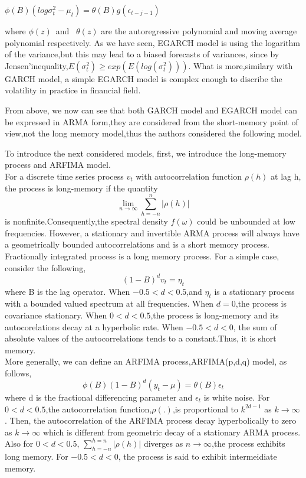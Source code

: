 \documentclass[10pt,a4paper]{article}
\begin{document}
\begin{center}$\displaystyle \phi(B)(log\sigma^2_t-\mu_t)=\theta(B)g(\epsilon_{t-j-1})$\end{center}

where $\phi(z)$\ and \ $\theta(z)$ are the autoregressive polynomial  and moving average polynomial respectively. As we have seen, EGARCH model is using the logarithm of the variance,but this may lead to a biased forecasts of variances, since by Jensen'inequality,$E(\sigma^2_t)\geq exp(E(log(\sigma^2_t)))$. What is more,similary with GARCH model, a simple EGARCH model is complex enough to discribe the volatility in practice in financial field.





From above, we now can see that both GARCH model and EGARCH model can be expressed in ARMA form,they are considered from the short-memory point of view,not the long memory model,thus the authors considered the following model.


  
  To introduce the next considered models, first, we introduce the long-memory process and ARFIMA model.\\
  
  For a discrete time series process $v_t$ with autocorrelation function $\rho (h)$ at lag h, the process is long-memory if the quantity
$$\lim\limits_{n\rightarrow\infty} \sum_{h=-n}^{n}|\rho(h)|$$
is nonfinite.Consequently,the spectral density $f(\omega)$ could be unbounded at low frequencies. However, a stationary and invertible ARMA process will always have a geometrically bounded autocorrelations and is a short memory process. Fractionally integrated process is a long memory process. For a simple case, consider the following,
$$(1-B)^dv_t=\eta_t$$
where B is the lag operator. When $-0.5<d<0.5$,and $\eta_t$ is a stationary process with a bounded valued spectrum at all frequencies. When $d=0$,the process is covariance stationary. When $0<d<0.5$,the process is long-memory and its autocorelations decay at a hyperbolic rate. When $-0.5<d<0$, the sum of absolute values of the autocorrelations tends to a constant.Thus, it is short memory.\\

 More generally, we can define an ARFIMA process,ARFIMA(p,d,q) model, as follows,
$$\phi(B)(1-B)^d(y_t-\mu)=\theta(B)\epsilon_t$$
where d is the fractional differencing parameter and $\epsilon_t$ is white noise. For $0<d<0.5$,the autocorrelation function,$\rho(.)$,is proportional to $k^{2d-1}$ as $k\rightarrow\infty$. Then, the autocorrelation of the ARFIMA process decay hyperbolically to zero as $k\rightarrow\infty$ which is different from geometric decay of a stationary ARMA process. Also for $0<d<0.5$, $\sum_{h=-n}^{h=n} |\rho(h)|$ diverges as $n\rightarrow \infty$,the process exhibits long memory. For $-0.5<d<0$, the process is said to exhibit intermeidiate memory.  \\
\end{document}
